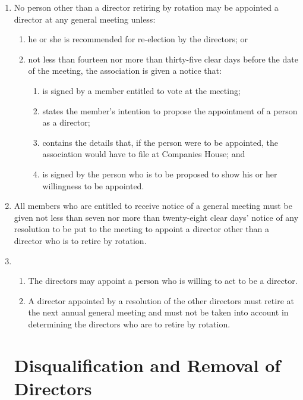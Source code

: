 \begin{enumerate}
\item
  No person other than a director retiring by rotation may be
  appointed a director at any general meeting unless:
  \begin{enumerate}
  \item
    he or she is recommended for re-election by the directors; or
  \item
    not less than fourteen nor more than thirty-five clear days before
    the date of the meeting, the association is given a notice that:
    \begin{enumerate}
    \item
      is signed by a member entitled to vote at the meeting;
    \item
      states the member's intention to propose the appointment of a
      person as a director;
    \item
      contains the details that, if the person were to be appointed, the
      association would have to file at Companies House; and
    \item
      is signed by the person who is to be proposed to show his or her
      willingness to be appointed.
    \end{enumerate}
  \end{enumerate}
\item
  All members who are entitled to receive notice of a general meeting
  must be given not less than seven nor more than twenty-eight clear
  days' notice of any resolution to be put to the meeting to appoint
  a director other than a director who is to retire by rotation.

\item
  \begin{enumerate}
  \item
    The directors may appoint a person who is willing to act to be a
    director.
  \item
    A director appointed by a resolution of the other directors must
    retire at the next annual general meeting and must not be taken
    into account in determining the directors who are to retire by
    rotation.
  \end{enumerate}

\section{Disqualification and Removal of Directors}


\end{enumerate}
